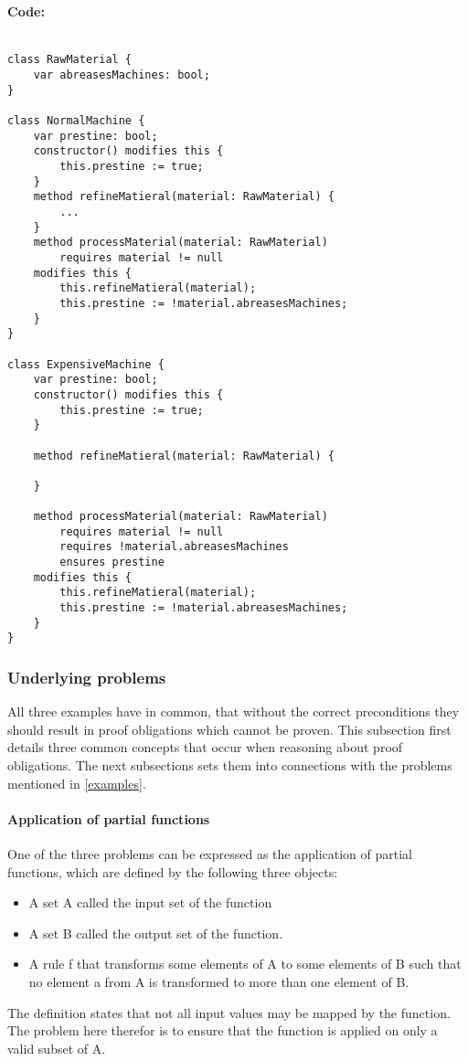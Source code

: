 \paragraph{Code:}
\begin{lstlisting}[language=dafny]

class RawMaterial {
	var abreasesMachines: bool;
}

class NormalMachine {
	var prestine: bool;
	constructor() modifies this {
		this.prestine := true;
	}
	method refineMatieral(material: RawMaterial) {
		...
	}
	method processMaterial(material: RawMaterial) 
		requires material != null
	modifies this {
		this.refineMatieral(material);
		this.prestine := !material.abreasesMachines;
	}
}

class ExpensiveMachine {
	var prestine: bool;
	constructor() modifies this {
		this.prestine := true;
	}
	
	method refineMatieral(material: RawMaterial) {
	
	}
	
	method processMaterial(material: RawMaterial) 
		requires material != null
		requires !material.abreasesMachines
		ensures prestine
	modifies this {
		this.refineMatieral(material);
		this.prestine := !material.abreasesMachines;
	}
}
\end{lstlisting}

\subsubsection{Underlying problems}
All three examples have in common, that without the correct preconditions they should result in proof obligations which cannot be proven.
This subsection first details three common concepts that occur when reasoning about proof obligations. The next subsections sets them into connections with the problems mentioned in \ref{examples}.

\paragraph{Application of partial functions} \label{partial function}
One of the three problems can be expressed as the application of partial functions, which are defined by the following three objects:
\begin{itemize}
	\item A set A called the input set of the function
	\item A set B called the output set of the function.
	\item A rule f that transforms some elements of A to some elements of B such that no element a from A is transformed to more than one element of B.\cite[197]{khoussainov}
\end{itemize}
The definition states that not all input values may be mapped by the function. The problem here therefor is to ensure that the function is applied on only a valid subset of A.


